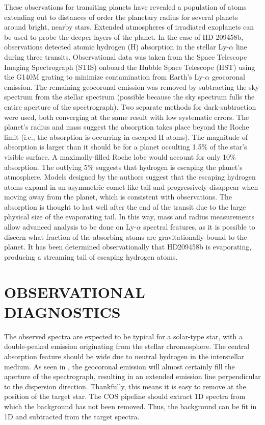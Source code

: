 \documentclass[onecolumn]{aastex63}
\begin{document}
These observations for transiting planets have revealed a population of atoms extending out to distances of order the planetary radius for several planets around bright, nearby stars. Extended atmospheres of irradiated exoplanets can be used to probe the deeper layers of the planet. In the case of HD 209458b, observations detected atomic hydrogen (H) absorption in the stellar Ly-$\alpha$ line during three transits. Observational data was taken from the Space Telescope Imaging Spectrograph (STIS) onboard the Hubble Space Telescope (HST) using the G140M grating to minimize contamination from Earth's Ly-$\alpha$ geocoronal emission. The remaining geocoronal emission was removed by subtracting the sky spectrum from the stellar spectrum (possible because the sky spectrum fulls the entire aperture of the spectrograph). Two separate methods for dark-subtraction were used, both converging at the same result with low systematic errors. The planet's radius and mass suggest the absorption takes place beyond the Roche limit (i.e., the absorption is occurring in escaped H atoms). The magnitude of absorption is larger than it should be for a planet occulting 1.5\% of the star's visible surface. A maximally-filled Roche lobe would account for only 10\% absorption. The outlying 5\% suggests that hydrogen is escaping the planet's atmosphere. Models designed by the authors suggest that the escaping hydrogen atoms expand in an asymmetric comet-like tail and progressively disappear when moving away from the planet, which is consistent with observations. The absorption is thought to last well after the end of the transit due to the large physical size of the evaporating tail. In this way, mass and radius measurements allow advanced analysis to be done on Ly-$\alpha$ spectral features, as it is possible to discern what fraction of the absorbing atoms are gravitationally bound to the planet. It has been determined observationally that HD209458b is evaporating, producing a streaming tail of escaping hydrogen atoms.

\newpage

\section{OBSERVATIONAL DIAGNOSTICS}

The observed spectra are expected to be typical for a solar-type star, with a double-peaked emission originating from the stellar chromosphere. The central absorption feature should be wide due to neutral hydrogen in the interstellar medium. As seen in \cite{2003Natur.422..143V}, the geocoronal emission will almost certainly fill the aperture of the spectrograph, resulting  in  an  extended emission line perpendicular to the dispersion direction. Thankfully, this means it is easy to remove at the position of the target star. The COS pipeline should extract 1D spectra from which the background has not been removed. Thus, the background can be fit in 1D and subtracted from the target spectra.
\end{document}
